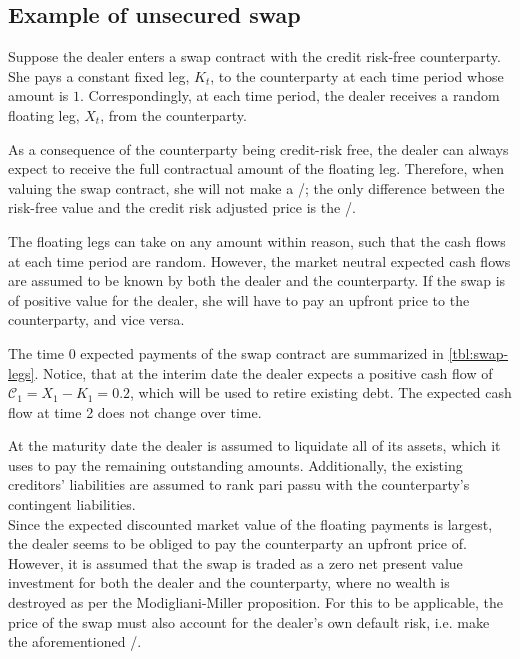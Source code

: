 \documentclass[main.tex]{subfiles}
\begin{document}
        \subsection{Example of unsecured swap}
            Suppose the dealer enters a swap contract with the credit risk-free counterparty.
            She pays a constant fixed leg, $K_t$, to the counterparty at each time period whose amount is $\num{1}$.
            Correspondingly, at each time period,
            the dealer receives a random floating leg, $X_t$, from the counterparty.

            As a consequence of the counterparty being credit-risk free,
            the dealer can always expect to receive the full contractual amount of the floating leg.
            Therefore, when valuing the swap contract,
            she will not make a \CVA/; 
            the only difference between the risk-free value and the credit risk adjusted price is the \DVA/.

            The floating legs can take on any amount within reason,
            such that the cash flows at each time period are random.
            However, the market neutral expected cash flows are assumed to be known
            by both the dealer and the counterparty.
            If the swap is of positive value for the dealer,
            she will have to pay an upfront price to the counterparty,
            and vice versa.

            The time 0 expected payments of the swap contract are summarized in \cref{tbl:swap-legs}.
            Notice, that at the interim date the dealer expects a positive cash flow of
            $\mathcal{C}_1 = X_1 - K_1 = \num{0.2}$,
            which will be used to retire existing debt.
            The expected cash flow at time 2 does not change over time.

            At the maturity date the dealer is assumed to liquidate all of its assets,
            which it uses to pay the remaining outstanding amounts.
            Additionally, the existing creditors' liabilities are assumed to rank pari passu with the counterparty's contingent liabilities.
            \\
            Since the expected discounted market value of the floating payments is largest,
            the dealer seems to be obliged to pay the counterparty an upfront price of.
            However, it is assumed that the swap is traded as a zero net present value investment
            for both the dealer and the counterparty,
            where no wealth is destroyed as per the Modigliani-Miller proposition.
            For this to be applicable, the price of the swap must also account for the dealer's own default risk,
            i.e. make the aforementioned \DVA/.
            
\end{document}
